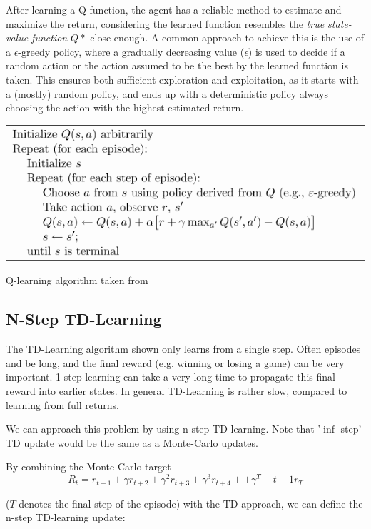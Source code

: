 After learning a Q-function, the agent has a reliable method to estimate and maximize the return, considering the learned function resembles the \textit{true state-value function} $Q*$ close enough. 
A common approach to achieve this is the use of a $\epsilon$-greedy policy, where a gradually decreasing value ($\epsilon$) is used to decide if a random action or the action assumed to be the best by the learned function is taken. This ensures both sufficient exploration and  exploitation, as it starts with a (mostly) random policy, and ends up with a deterministic policy always choosing the action with the highest estimated return.\citet{Sut98}

\includegraphics[scale=0.5]{bilder/qlearning2.png}

\caption{Q-learning algorithm taken from \citep{Sut98}}

\subsection{N-Step TD-Learning}

The TD-Learning algorithm shown only learns from a single step. Often episodes and be long, and the final reward (e.g. winning or losing a game) can be very important. 1-step learning can take a very long time to propagate this final reward into earlier states. In general TD-Learning is rather slow, compared to learning from full returns.

We can approach this problem by using n-step TD-learning.
Note that '$\inf$-step' TD update would be the same as a Monte-Carlo updates.

By combining the Monte-Carlo target
\begin{equation}
R_t = r_{t+1}+\gamma r_{t+2}+\gamma^2 r_{t+3}+\gamma^3 r_{t+4}++\gamma^T-t-1 r_{T}
\end{equation}

 ($T$ denotes the final step of the episode) with the TD approach, we can define the n-step TD-learning update:
 
